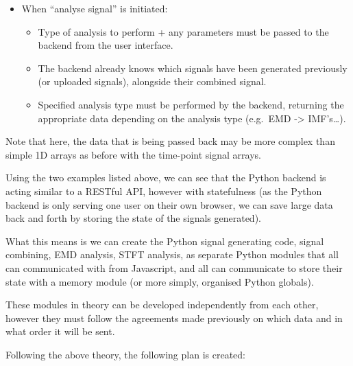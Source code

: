 \documentclass[
  english,
  paper=a4,
  oneside  ,captions=tableheading
]{scrbook}
\providecommand{\tightlist}{%
  \setlength{\itemsep}{0pt}\setlength{\parskip}{0pt}}
\begin{document}
\begin{itemize}
\tightlist
\item
  When ``analyse signal'' is initiated:

  \begin{itemize}
  \tightlist
  \item
    Type of analysis to perform + any parameters must be passed to the
    backend from the user interface.
  \item
    The backend already knows which signals have been generated
    previously (or uploaded signals), alongside their combined signal.
  \item
    Specified analysis type must be performed by the backend, returning
    the appropriate data depending on the analysis type (e.g.~EMD
    -\textgreater{} IMF's\ldots).
  \end{itemize}
\end{itemize}

Note that here, the data that is being passed back may be more complex
than simple 1D arrays as before with the time-point signal arrays.

Using the two examples listed above, we can see that the Python backend
is acting similar to a RESTful API, however with statefulness (as the
Python backend is only serving one user on their own browser, we can
save large data back and forth by storing the state of the signals
generated).

What this means is we can create the Python signal generating code,
signal combining, EMD analysis, STFT analysis, as separate Python
modules that all can communicated with from Javascript, and all can
communicate to store their state with a memory module (or more simply,
organised Python globals).

These modules in theory can be developed independently from each other,
however they must follow the agreements made previously on which data
and in what order it will be sent.

Following the above theory, the following plan is created:
\end{document}

